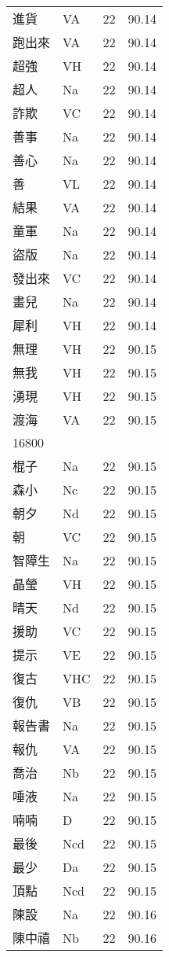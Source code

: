 \documentclass[twocolumn]{book}
\begin{document}
\begin{supertabular}{llrr}
進貨 & VA & 22 &  90.14\\
跑出來 & VA & 22 &  90.14\\
超強 & VH & 22 &  90.14\\
超人 & Na & 22 &  90.14\\
詐欺 & VC & 22 &  90.14\\
善事 & Na & 22 &  90.14\\
善心 & Na & 22 &  90.14\\
善 & VL & 22 &  90.14\\
結果 & VA & 22 &  90.14\\
童軍 & Na & 22 &  90.14\\
盜版 & Na & 22 &  90.14\\
發出來 & VC & 22 &  90.14\\
畫兒 & Na & 22 &  90.14\\
犀利 & VH & 22 &  90.14\\
無理 & VH & 22 &  90.15\\
無我 & VH & 22 &  90.15\\
湧現 & VH & 22 &  90.15\\
渡海 & VA & 22 &  90.15\\
16800\\
棍子 & Na & 22 &  90.15\\
森小 & Nc & 22 &  90.15\\
朝夕 & Nd & 22 &  90.15\\
朝 & VC & 22 &  90.15\\
智障生 & Na & 22 &  90.15\\
晶瑩 & VH & 22 &  90.15\\
晴天 & Nd & 22 &  90.15\\
援助 & VC & 22 &  90.15\\
提示 & VE & 22 &  90.15\\
復古 & VHC & 22 &  90.15\\
復仇 & VB & 22 &  90.15\\
報告書 & Na & 22 &  90.15\\
報仇 & VA & 22 &  90.15\\
喬治 & Nb & 22 &  90.15\\
唾液 & Na & 22 &  90.15\\
喃喃 & D & 22 &  90.15\\
最後 & Ncd & 22 &  90.15\\
最少 & Da & 22 &  90.15\\
頂點 & Ncd & 22 &  90.15\\
陳設 & Na & 22 &  90.16\\
陳中禧 & Nb & 22 &  90.16\\

\end{supertabular}
\end{document}
